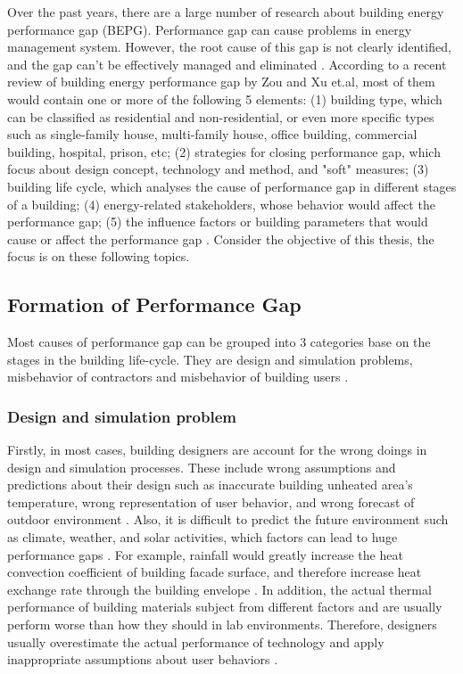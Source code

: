 \documentclass[11pt, a4paper]{article}
\theoremstyle{definition}
\begin{document}
	Over the past years, there are a large number of research about building energy performance gap (BEPG). Performance gap can cause problems in energy management system. However, the root cause of this gap is not clearly identified, and the gap can't be effectively managed and eliminated \cite{FREI2017421}.
	According to a recent review of building energy performance gap by Zou and Xu et.al, most of them would contain one or more of the following 5 elements: (1) building type, which can be classified as residential and non-residential, or even more specific types such as single-family house, multi-family house, office building, commercial building, hospital, prison, etc; (2) strategies for closing performance gap, which focus about design concept, technology and method, and "soft" measures; (3) building life cycle, which analyses the cause of performance gap in different stages of a building; (4) energy-related stakeholders, whose behavior would affect the performance gap; (5) the influence factors or building parameters that would cause or affect the performance gap \cite{FREI2017421,ZOU2018165}. Consider the objective of this thesis, the focus is on these following topics.
	
	\subsection{Formation of Performance Gap}
		Most causes of performance gap can be grouped into 3 categories base on the stages in the building life-cycle. They are design and simulation problems, misbehavior of contractors and misbehavior of building users \cite{userevaluations,NIU2016275}.
		
		\subsubsection{Design and simulation problem}
		Firstly, in most cases, building designers are account for the wrong doings in design and simulation processes. These include wrong assumptions and predictions about their design such as inaccurate building unheated area's temperature, wrong representation of user behavior, and wrong forecast of outdoor environment \cite{HOFFMANN201731,NIU2016275}. Also, it is difficult to predict the future environment such as climate, weather, and solar activities, which factors can lead to huge performance gaps \cite{DIAZ2017393,doi:10.1080/19401493.2012.718797}. For example, rainfall would greatly increase the heat convection coefficient of building facade surface, and therefore increase heat exchange rate through the building envelope \cite{DIAZ2017393}. In addition, the actual thermal performance of building materials subject from different factors and are usually perform worse than how they should in lab environments. Therefore, designers usually overestimate the actual performance of technology and apply inappropriate assumptions about user behaviors \cite{DEWILDE201440}. 
\end{document}
